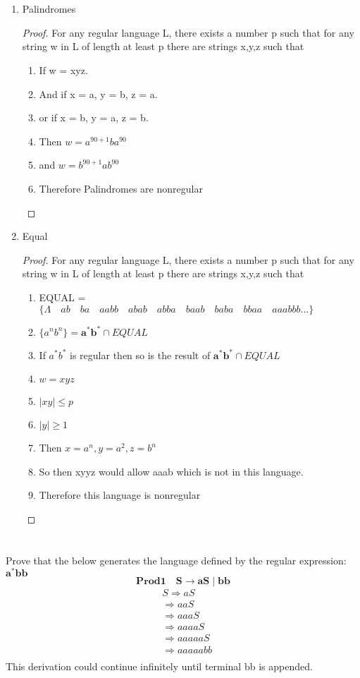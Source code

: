 \documentclass[12pt,a4paper,oneside]{report}
\begin{document}
\section{}
\begin{enumerate}
\item Palindromes
\begin{proof}
For any regular language L, there exists a number p such that for any string w in L of length at least p there are strings x,y,z such that
\begin{enumerate}
\item If w = xyz.
\item And if x = a, y = b, z = a.
\item or if x = b, y = a, z = b.
\item Then $w = a^{90 + 1}ba^{90}$
\item and $w = b^{90 + 1}ab^{90}$
\item Therefore Palindromes are nonregular
\end{enumerate}
\end{proof}
\item Equal
\begin{proof}
For any regular language L, there exists a number p such that for any string w in L of length at least p there are strings x,y,z such that
\begin{enumerate}
\item  EQUAL = $\{\Lambda \quad ab \quad ba \quad aabb \quad abab \quad abba \quad baab \quad baba \quad bbaa \quad aaabbb...\}$
\item $\{a^nb^n\} = \mathbf{a^*b^*} \cap EQUAL$
\item If $a^*b^*$ is regular then so is the result of $\mathbf{a^*b^*} \cap EQUAL$
\item $w =  xyz$
\item $\mid xy \mid \le  p$
\item $\mid y \mid \ge 1$
\item Then $x = a^n, y = a^2, z = b^n$
\item So then xyyz would allow aaab which is not in this language.
\item Therefore this language is nonregular
\end{enumerate}
\end{proof}
\end{enumerate}
\section{}
Prove that the below generates the language defined by the regular expression: $\mathbf{a^*bb}$
$$\mathbf {Prod 1 \quad S \to aS \mid bb}$$
\begin{equation}
\begin{split}
&S \Longrightarrow aS\\
&\Longrightarrow aaS\\
&\Longrightarrow aaaS\\
&\Longrightarrow aaaaS\\
&\Longrightarrow aaaaaS\\
&\Longrightarrow aaaaabb\\
\end{split}
\end{equation}
This derivation could continue infinitely until terminal bb is appended.
\end{document}
